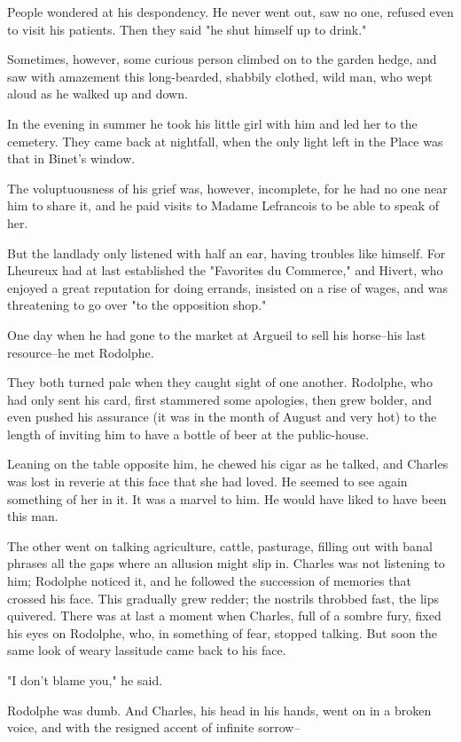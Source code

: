 \documentclass{tufte-book}
\begin{document}
People wondered at his despondency. He never went out, saw no one,
refused even to visit his patients. Then they said "he shut himself up
to drink."

Sometimes, however, some curious person climbed on to the garden hedge,
and saw with amazement this long-bearded, shabbily clothed, wild man,
who wept aloud as he walked up and down.

In the evening in summer he took his little girl with him and led her to
the cemetery. They came back at nightfall, when the only light left in
the Place was that in Binet's window.

The voluptuousness of his grief was, however, incomplete, for he had no
one near him to share it, and he paid visits to Madame Lefrancois to be
able to speak of her.

But the landlady only listened with half an ear, having troubles
like himself. For Lheureux had at last established the "Favorites du
Commerce," and Hivert, who enjoyed a great reputation for doing errands,
insisted on a rise of wages, and was threatening to go over "to the
opposition shop."

One day when he had gone to the market at Argueil to sell his horse--his
last resource--he met Rodolphe.

They both turned pale when they caught sight of one another. Rodolphe,
who had only sent his card, first stammered some apologies, then grew
bolder, and even pushed his assurance (it was in the month of August and
very hot) to the length of inviting him to have a bottle of beer at the
public-house.

Leaning on the table opposite him, he chewed his cigar as he talked, and
Charles was lost in reverie at this face that she had loved. He seemed
to see again something of her in it. It was a marvel to him. He would
have liked to have been this man.

The other went on talking agriculture, cattle, pasturage, filling out
with banal phrases all the gaps where an allusion might slip in. Charles
was not listening to him; Rodolphe noticed it, and he followed the
succession of memories that crossed his face. This gradually grew
redder; the nostrils throbbed fast, the lips quivered. There was at
last a moment when Charles, full of a sombre fury, fixed his eyes on
Rodolphe, who, in something of fear, stopped talking. But soon the same
look of weary lassitude came back to his face.

"I don't blame you," he said.

Rodolphe was dumb. And Charles, his head in his hands, went on in a
broken voice, and with the resigned accent of infinite sorrow--
\end{document}
